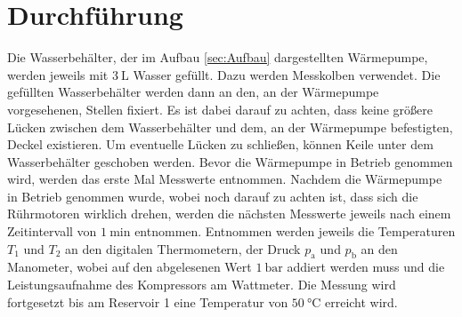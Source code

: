 
\section{Durchführung}
\label{sec:Durchführung}

Die Wasserbehälter, der im Aufbau \ref{sec:Aufbau} dargestellten Wärmepumpe, werden jeweils mit $\SI{3}{\liter}$ Wasser gefüllt. Dazu werden Messkolben verwendet. Die gefüllten Wasserbehälter werden dann an den, an der Wärmepumpe vorgesehenen, Stellen fixiert. Es ist dabei darauf zu achten, dass keine größere Lücken zwischen dem Wasserbehälter und dem, an der Wärmepumpe befestigten, Deckel existieren. Um eventuelle Lücken zu schließen, können Keile unter dem Wasserbehälter geschoben werden. Bevor die Wärmepumpe in Betrieb genommen wird, werden das erste Mal Messwerte entnommen. Nachdem die Wärmepumpe in Betrieb genommen wurde, wobei noch darauf zu achten ist, dass sich die Rührmotoren wirklich drehen, werden die nächsten Messwerte jeweils nach einem Zeitintervall von $\SI{1}{\minute}$ entnommen. Entnommen werden jeweils die Temperaturen $T_1$ und $T_2$ an den digitalen Thermometern, der Druck $p_\text{a}$ und $p_\text{b}$ an den Manometer, wobei auf den abgelesenen Wert $\SI{1}{\bar}$ addiert werden muss und die Leistungsaufnahme des Kompressors am Wattmeter. Die Messung wird fortgesetzt bis am Reservoir 1 eine Temperatur von $\SI{50}{\degreeCelsius}$ erreicht wird.